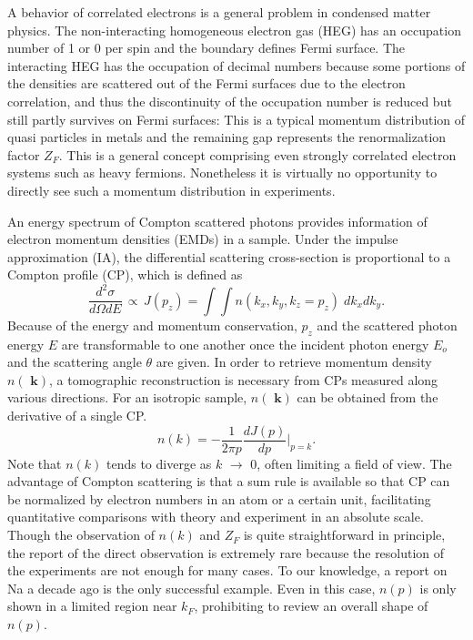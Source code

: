 \documentclass[twocolumn,showpacs,showkeys,fleqn,prl,superscriptaddress]{revtex4}%
\newcommand{\bb}[1]{\textbf{ #1}}
\begin{document}
A behavior of correlated electrons is a general problem in condensed matter physics.
The non-interacting homogeneous electron gas (HEG) has an occupation number of 1 or 0 per spin and the boundary defines Fermi surface. 
The interacting HEG has the occupation of decimal numbers because some portions of the densities are scattered out of the Fermi surfaces due to the electron correlation, and thus the discontinuity of the occupation number is reduced but still partly survives on Fermi surfaces: This is a typical momentum distribution of quasi particles in metals and the remaining gap represents the renormalization factor $Z_F$. 
This is a general concept comprising even strongly correlated electron systems such as heavy fermions.         
Nonetheless it is virtually no opportunity to directly see such a momentum distribution in experiments.

An energy spectrum of Compton scattered photons provides information of electron momentum densities (EMDs) in a sample\cite{sch}.
Under the impulse approximation (IA)\cite{eisen70,kaplan03}, the differential scattering cross-section is proportional to a Compton profile (CP), which is defined as
\begin{equation}
\frac{d^2\sigma}{d\Omega dE} \,\propto \, J(p_z) = \int \!\! \int n(k_x,k_y,k_z\!=\!p_z) \;dk_x dk_y .
\end{equation}
Because of the energy and momentum conservation, $p_z$ and the scattered photon energy $E$ are transformable to one another once the incident photon energy $E_o$ and the scattering angle $\theta$ are given.  
In order to retrieve momentum density $n(\!\!\bb{k})$, a tomographic reconstruction is necessary from CPs measured along various directions.
For an isotropic sample, $n(\!\!\bb{k})$ can be obtained from the derivative of a single CP. 
\begin{equation}
n(k) = - \frac{1}{2 \pi p} \frac{d J(p)}{d p}  | _{p=k}   .
\end{equation}
Note that $n(k)$ tends to diverge as $k$ $\to$ 0, often limiting a field of view.  
The advantage of Compton scattering is that a sum rule is available so that CP can be normalized by electron numbers in an atom or a certain unit, facilitating quantitative comparisons with theory and experiment in an absolute scale.
Though the observation of $n(k)$ and $Z_F$ is quite straightforward in principle, the report of the direct observation is extremely rare because the resolution of the experiments are not enough for many cases.
To our knowledge, a report on Na a decade ago is the only successful example\cite{simo10}.
Even in this case, $n(p)$ is only shown in a limited region near $k_F$, prohibiting to review an overall shape of $n(p)$.
\end{document}
